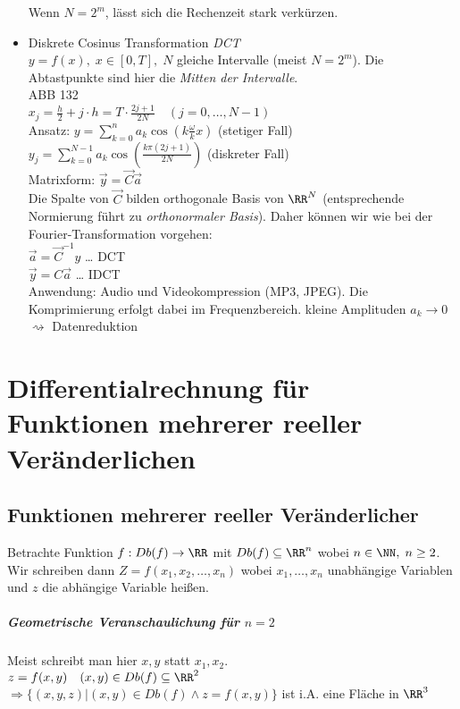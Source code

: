 \begin{itemize}
Wenn $N=2^m$, lässt sich die Rechenzeit stark verkürzen.
\item Diskrete Cosinus Transformation \emph{DCT}\\
$y=f(x) , \; x \in [0,T], \; N$ gleiche Intervalle (meist $N=2^m$). Die Abtastpunkte sind hier die \emph{Mitten der Intervalle}.\\
ABB 132\\
$x_j=\frac{h}{2}+j\cdot h=T\cdot \frac{2j+1}{2N} \quad (j=0,\dots, N-1)$\\
Ansatz: $y=\sum_{k=0}^n a_k \cos (k\frac{\omega}{k}x)$ (stetiger Fall)\\
$y_j=\sum_{k=0}^{N-1} a_k \cos\left(\frac{k\pi (2j+1)}{2N}\right)$ (diskreter Fall)\\
Matrixform: $\vec{y}=\vec{C}\vec{a}$\\
Die Spalte von $\vec{C}$ bilden orthogonale Basis von $\RR^N$ (entsprechende Normierung führt zu \emph{orthonormaler Basis}). Daher können wir wie bei der Fourier-Transformation vorgehen:\\
$\vec{a}=\vec{C}^{-1}y$ … DCT\\
$\vec{y}=C \vec{a}$ … IDCT\\
Anwendung: Audio und Videokompression (MP3, JPEG). Die Komprimierung erfolgt dabei im Frequenzbereich. kleine Amplituden $a_k\to 0$ $\rightsquigarrow$ Datenreduktion
\end{itemize}

\chapter{Differentialrechnung für Funktionen mehrerer reeller Veränderlichen}
\section{Funktionen mehrerer reeller Veränderlicher}
Betrachte Funktion $f: Db(f) \to \RR$ mit $Db(f)\subseteq \RR^n$ wobei $n\in \NN, \; n\geq 2$. Wir schreiben dann $Z=f(x_1, x_2, \dots, x_n)$ wobei $x_1, \dots, x_n$ unabhängige Variablen und $z$ die abhängige Variable heißen.
\paragraph{Geometrische Veranschaulichung für $n=2$} Meist schreibt man hier $x,y$ statt $x_1, x_2$.\\
$z=f(x,y) \quad (x,y) \in Db(f) \subseteq \RR^2$\\
$\Rightarrow \{(x,y,z) | (x,y) \in Db(f) \wedge z = f(x,y)\}$ ist i.A. eine Fläche in $\RR^3$
